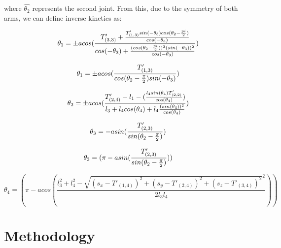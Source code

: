 \documentclass[conference]{IEEEtran}
\begin{document}
\begin{strip}
where $\hat{\theta_{2}}$ represents the second joint. From this, due to the symmetry of both arms, we can define inverse kinetics as:
\end{strip}
\begin{strip}
\begin{equation}
\theta_{1}= \pm acos(\frac{T'_{(3,3)}+ \frac{T'_{(1,3)}sin(-\theta_{3})cos(\theta_{2}-\frac{pi}{2})}{cos(-\theta_{3})}}{cos(-\theta_{3})+ \frac{(cos(\theta_{2}-\frac{pi}{2}))^2(sin(-\theta_{3}))^2}{cos(-\theta_{3})}})\\
\end{equation}
\end{strip}
\begin{strip}
\begin{equation}
\theta_{1}= \pm acos(\frac{T'_{(1,3)}}{cos(\theta_{2}-\frac{\pi}{2})sin(-\theta_{3})})\\
\end{equation}
\end{strip}
\begin{strip}
\begin{equation}
\theta_{2}= \pm acos(\frac{T'_{(2,4)}-l_{1}-(\frac{l_{4}sin(\theta_{4})T'_{(2,2)}}{\cos(\theta_{4})})}{l_{3}+l_{4}cos(\theta_{4})+l_{4}\frac{(sin(\theta_{4}))^2}{cos(\theta_{4})}})\\
\end{equation}
\end{strip}
\begin{strip}
\begin{equation}
\theta_{3}= -asin(\frac{T'_{(2,3)}}{sin(\theta_{2}-\frac{\pi}{2})})\\
\end{equation}
\end{strip}
\begin{strip}
\begin{equation}
\theta_{3}= (\pi-asin(\frac{T'_{(2,3)}}{sin(\theta_{2}-\frac{\pi}{2})}))\\
\end{equation}
\end{strip}
\begin{strip}
\begin{equation}
\theta_{4}= (\pi-acos(\frac{l_{3}^2+l_{4}^2-\sqrt{(s_{x}-T'_{(1,4)})^2+(s_{y}-T'_{(2,4)})^2+(s_{z}-T'_{(3,4)})^2}^2}{2l_{3}l_{4}}))
\end{equation}
\end{strip}

\section{Methodology}
\end{document}
